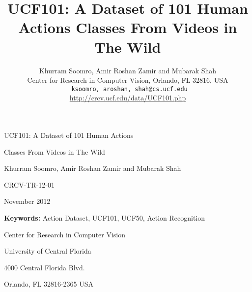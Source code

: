 \documentclass[10pt,twocolumn,letterpaper]{article}
\begin{document}
\onecolumn


\vspace*{20 mm}

\begin{center}
{\huge UCF101: A Dataset of 101 Human Actions }
\end{center}

\begin{center}
{\huge Classes From Videos in The Wild}
\end{center}

\begin{center}
Khurram Soomro, Amir Roshan Zamir and Mubarak Shah
\end{center}

\begin{center}
CRCV-TR-12-01
\end{center}

\begin{center}
November 2012
\end{center}

\vspace{120 mm}


\begin{center}
\textbf{Keywords:}  Action Dataset, UCF101, UCF50, Action Recognition
\end{center}

\vspace{5 mm}

\begin{center}
Center for Research in Computer Vision
\end{center}

\begin{center}
University of Central Florida
\end{center}

\begin{center}
4000 Central Florida Blvd.
\end{center}

\begin{center}
Orlando, FL 32816-2365 USA
\end{center}

\twocolumn

\title{UCF101: A Dataset of 101 Human Actions Classes From Videos in The Wild}
\author{Khurram Soomro, Amir Roshan Zamir and Mubarak Shah\\
Center for Research in Computer Vision, Orlando, FL 32816, USA\\
{\tt\ ksoomro, aroshan, shah@cs.ucf.edu}\\
{\url{http://crcv.ucf.edu/data/UCF101.php}}
}
\end{document}
